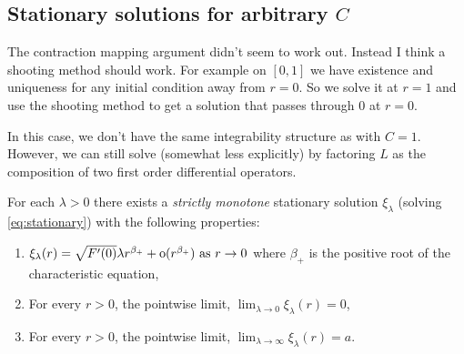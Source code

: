 \documentclass{amsart}
\begin{document}
\subsection{Stationary solutions for arbitrary \(C\)}

{\color{red} The contraction mapping argument didn't seem to work out. Instead I think a shooting method should work. For example on \([0, 1]\) we have existence and uniqueness for any initial condition away from \(r=0\). So we solve it at \(r=1\) and use the shooting method to get a solution that passes through \(0\) at \(r=0\).}

In this case, we don't have the same integrability structure as with \(C = 1\). However, we can still solve (somewhat less explicitly) by factoring \(L\) as the composition of two first order differential operators.

\begin{lemma}
\label{lem:stationaryC}
For each \(\lambda > 0 \) there exists a \emph{strictly monotone} stationary solution \(\xi_{\lambda}\) (solving \eqref{eq:stationary}) with the following properties:
\begin{enumerate}
\item \(\xi_{\lambda} (r) = \sqrt{F'(0)} \lambda r^{\beta_+} + \operatorname{o}(r^{\beta_+}) \text{ as } r \to 0\) where \(\beta_+\) is the positive root of the characteristic equation, \label{itm:stationaryC_asymptotic}
\item For every \(r > 0\), the pointwise limit, \(\lim_{\lambda \to 0} \xi_{\lambda} (r) = 0\), \label{itm:stationaryC_lambda_0}
\item For every \(r > 0\), the pointwise limit, \(\lim_{\lambda \to \infty} \xi_{\lambda} (r) = a\). \label{itm:stationaryC_lambda_infty}
\end{enumerate}
\end{lemma}
\end{document}
